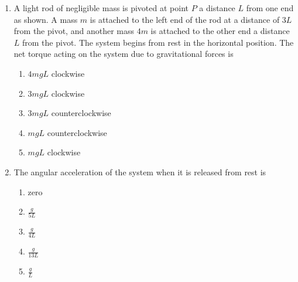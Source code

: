 \documentclass{../../../oss-apphys}
\begin{document}
\begin{multicols}{2}
\begin{enumerate}[leftmargin=18pt]
  \item A light rod of negligible mass is pivoted at point $P$ a distance $L$
    from one end as shown. A mass $m$ is attached to the left end of the rod at
    a distance of $3L$ from the pivot, and another mass $4m$ is attached to the
    other end a distance $L$ from the pivot. The system begins from rest in the
    horizontal position. The net torque acting on the system due to
    gravitational forces is
    \begin{center}
    \end{center}
    \begin{enumerate}[nosep,leftmargin=18pt,label=(\Alph*)]
    \item $4mgL$ clockwise
    \item $3mgL$ clockwise
    \item $3mgL$ counterclockwise
    \item $mgL$ counterclockwise
    \item $mgL$ clockwise
    \end{enumerate}
    
  \item The angular acceleration of the system when it is released from rest is
    \begin{enumerate}[nosep,leftmargin=18pt,label=(\Alph*)]
    \item zero
    \item $\displaystyle\frac{g}{5L}$
    \item $\displaystyle\frac{g}{4L}$
    \item $\displaystyle\frac{g}{13L}$
    \item  $\displaystyle\frac{g}{L}$
    \end{enumerate}
  \end{enumerate}
\end{multicols}
\newpage


\genfreedirections
\end{document}
